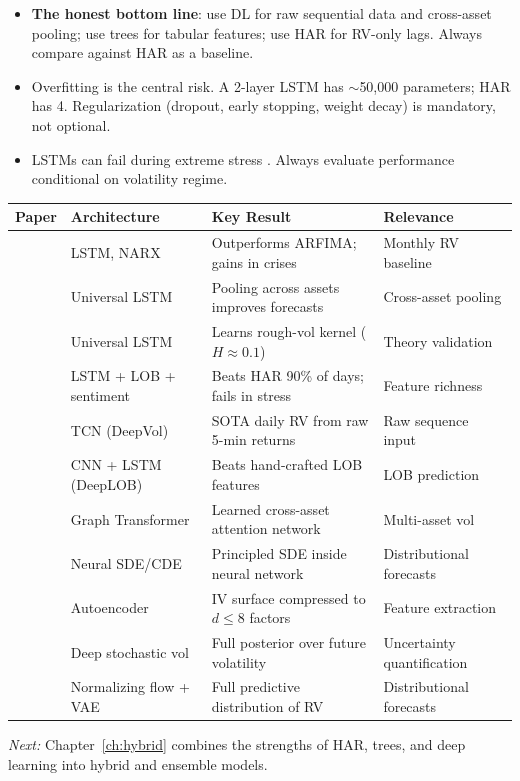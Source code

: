 \begin{itemize}
  \item \textbf{The honest bottom line}: use DL for raw sequential data and cross-asset pooling; use trees for tabular features; use HAR for RV-only lags.
    Always compare against HAR as a baseline.

  \item Overfitting is the central risk. A 2-layer LSTM has $\sim$50,000 parameters; HAR has 4. Regularization (dropout, early stopping, weight decay) is mandatory, not optional.

  \item LSTMs can fail during extreme stress \citep{RahimikiaPoon2020}. Always evaluate performance conditional on volatility regime.
\end{itemize}

\begin{center}
\small
\begin{tabular}{llll}
\toprule
\textbf{Paper} & \textbf{Architecture} & \textbf{Key Result} & \textbf{Relevance} \\
\midrule
\citet{Bucci2020}
  & LSTM, NARX
  & Outperforms ARFIMA; gains in crises
  & Monthly RV baseline \\[3pt]
\citet{SirignanoCont2019}
  & Universal LSTM
  & Pooling across assets improves forecasts
  & Cross-asset pooling \\[3pt]
\citet{RosenbaumZhang2022}
  & Universal LSTM
  & Learns rough-vol kernel ($H \approx 0.1$)
  & Theory validation \\[3pt]
\citet{RahimikiaPoon2020}
  & LSTM + LOB + sentiment
  & Beats HAR 90\% of days; fails in stress
  & Feature richness \\[3pt]
\citet{MorenoPinoZohren2022DeepVol}
  & TCN (DeepVol)
  & SOTA daily RV from raw 5-min returns
  & Raw sequence input \\[3pt]
\citet{ZhangZohrenRoberts2019DeepLOB}
  & CNN + LSTM (DeepLOB)
  & Beats hand-crafted LOB features
  & LOB prediction \\[3pt]
\citet{ChenRobert2022}
  & Graph Transformer
  & Learned cross-asset attention network
  & Multi-asset vol \\[3pt]
\citet{Kidger2021NeuralSDE}
  & Neural SDE/CDE
  & Principled SDE inside neural network
  & Distributional forecasts \\[3pt]
\citet{DingLuCheung2025}
  & Autoencoder
  & IV surface compressed to $d \le 8$ factors
  & Feature extraction \\[3pt]
\citet{XuChen2021}
  & Deep stochastic vol
  & Full posterior over future volatility
  & Uncertainty quantification \\[3pt]
\citet{DuMoriyamaTanakaIshii2023}
  & Normalizing flow + VAE
  & Full predictive distribution of RV
  & Distributional forecasts \\
\bottomrule
\end{tabular}
\end{center}

\bigskip
\noindent\textit{Next:} Chapter~\ref{ch:hybrid} combines the strengths of HAR, trees, and deep learning into hybrid and ensemble models.

